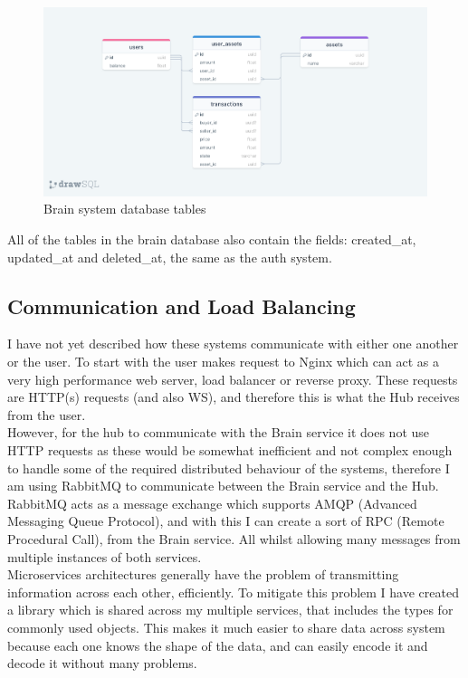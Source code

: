 \documentclass[titlepage]{article}
\begin{document}
\begin{figure}
  \caption{Brain system database tables}
\centering
\hspace*{-2cm}
\includegraphics[width=1.25\textwidth]{brain_diagram.png}
\end{figure}

All of the tables in the brain database also contain the fields: created\_at, updated\_at and deleted\_at, the same as the auth system.

\subsection{Communication and Load Balancing}
I have not yet described how these systems communicate with either one another or the user. To start with the user makes request to Nginx which can act as a very high performance web server, load balancer or reverse proxy. These requests are HTTP(s) requests (and also WS), and therefore this is what the Hub receives from the user. \\

However, for the hub to communicate with the Brain service it does not use HTTP requests as these would be somewhat inefficient and not complex enough to handle some of the required distributed behaviour of the systems, therefore I am using RabbitMQ to communicate between the Brain service and the Hub. RabbitMQ acts as a message exchange which supports AMQP (Advanced Messaging Queue Protocol), and with this I can create a sort of RPC (Remote Procedural Call), from the Brain service. All whilst allowing many messages from multiple instances of both services. \\

Microservices architectures generally have the problem of transmitting information across each other, efficiently. To mitigate this problem I have created a library which is shared across my multiple services, that includes the types for commonly used objects. This makes it much easier to share data across system because each one knows the shape of the data, and can easily encode it and decode it without many problems.
\end{document}
